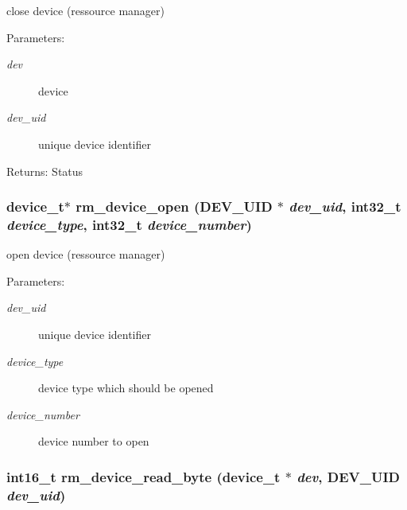 close device (ressource manager) 

\begin{Desc}
\item[Parameters:]
\begin{description}
\item[{\em dev}]device \item[{\em dev\_\-uid}]unique device identifier \end{description}
\end{Desc}
\begin{Desc}
\item[Returns:]Status \end{Desc}
\hypertarget{group___d_e_v_i_c_e___a_p_i_g2b7371d08d6707e136b6027980c5e49f}{
\subsubsection[{rm\_\-device\_\-open}]{\setlength{\rightskip}{0pt plus 5cm}device\_\-t$\ast$ rm\_\-device\_\-open ({\bf DEV\_\-UID} $\ast$ {\em dev\_\-uid}, \/  int32\_\-t {\em device\_\-type}, \/  int32\_\-t {\em device\_\-number})}}
\label{group___d_e_v_i_c_e___a_p_i_g2b7371d08d6707e136b6027980c5e49f}


open device (ressource manager) 

\begin{Desc}
\item[Parameters:]
\begin{description}
\item[{\em dev\_\-uid}]unique device identifier \item[{\em device\_\-type}]device type which should be opened \item[{\em device\_\-number}]device number to open \end{description}
\end{Desc}
\hypertarget{group___d_e_v_i_c_e___a_p_i_gf62d9b836db6b6a2d17d6b6f86c556d2}{
\subsubsection[{rm\_\-device\_\-read\_\-byte}]{\setlength{\rightskip}{0pt plus 5cm}int16\_\-t rm\_\-device\_\-read\_\-byte (device\_\-t $\ast$ {\em dev}, \/  {\bf DEV\_\-UID} {\em dev\_\-uid})}}
\label{group___d_e_v_i_c_e___a_p_i_gf62d9b836db6b6a2d17d6b6f86c556d2}


